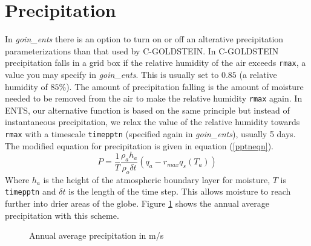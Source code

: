 \documentclass[10pt,a4paper]{report}
\begin{document}
\section{Precipitation}

In {\em goin\_ents} there is an option to turn on or off an
alterative precipitation parameterizations than that used by
C-GOLDSTEIN. In C-GOLDSTEIN precipitation falls in a grid box if the
relative humidity of the air exceeds {\tt rmax}, a value you may
specify in {\em goin\_ents}. This is usually set to $0.85$ (a
relative humidity of $85$\%). The amount of precipitation falling is
the amount of moisture needed to be removed from the air to make the
relative humidity {\tt rmax} again. In ENTS, our alternative
function is based on the same principle but instead of instantaneous
precipitation, we relax the value of the relative humidity towards
{\tt rmax} with a timescale {\tt timepptn} (specified again in {\em
goin\_ents}), usually 5 days. The modified equation for
precipitation is given in equation (\ref{pptneqn}).
\begin{equation}\label{pptneqn}
P=\frac{1}{T}\frac{\rho_{a} h_a}{\rho_{o} \delta
t}(q_{a}-r_{max}q_{s}(T_{a}))
\end{equation}
Where $h_a$ is the height of the atmospheric boundary layer for
moisture, $T$ is {\tt timepptn} and $\delta t$ is the length of
the time step. This allows moisture to reach further into drier
areas of the globe. Figure \ref{pptn} shows the annual average
precipitation with this scheme.

\begin{figure}
\centerline{}
\caption{Annual average precipitation in m/s}\label{pptn}
\end{figure}
\end{document}
